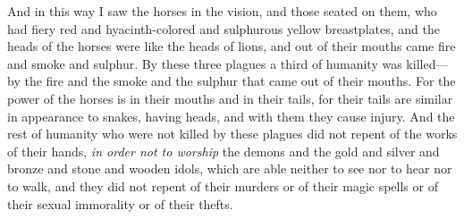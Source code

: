 \begin{biblechapter}
\verse And in this way I saw the horses in the vision, and those seated on them, who had fiery red and hyacinth-colored and sulphurous yellow breastplates, and the heads of the horses were like the heads of lions, and out of their mouths came fire and smoke and sulphur.
\verse By these three plagues a third of humanity was killed—by the fire and the smoke and the sulphur that came out of their mouths.
\verse For the power of the horses is in their mouths and in their tails, for their tails are similar in appearance to snakes, having heads, and with them they cause injury.
\verse And the rest of humanity who were not killed by these plagues did not repent of the works of their hands, \textit{in order not to worship} the demons and the gold and silver and bronze and stone and wooden idols, which are able neither to see nor to hear nor to walk,
\verse and they did not repent of their murders or of their magic spells or of their sexual immorality or of their thefts.
\end{biblechapter}

